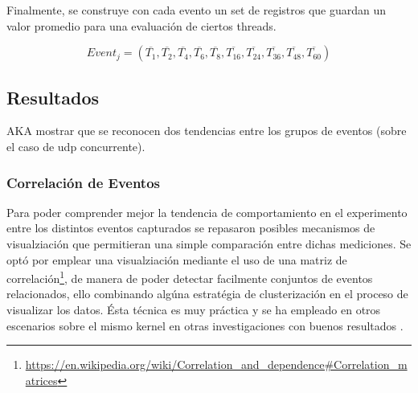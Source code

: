Finalmente, se construye con cada evento un set de registros que guardan un valor promedio para una evaluación de ciertos threads.

\begin{equation}
Event_j = \left(\overline{T_{1}}, \overline{T_{2}}, \overline{T_{4}}, \overline{T_{6}}, \overline{T_{8}}, \overline{T_{16}}, \overline{T_{24}}, \overline{T_{36}}, \overline{T_{48}}, \overline{T_{60}}\right)
\end{equation}

\subsection{Resultados}
AKA mostrar que se reconocen dos tendencias entre los grupos de eventos (sobre el caso de udp concurrente).


\subsubsection{Correlación de Eventos}
Para poder comprender mejor la tendencia de comportamiento en el experimento entre los distintos eventos capturados se repasaron posibles mecanismos de visualziación que permitieran una simple comparación entre dichas mediciones. Se optó por emplear una visualziación mediante el uso de una matriz de correlación\footnote{\url{https://en.wikipedia.org/wiki/Correlation_and_dependence#Correlation_matrices}}, de manera de poder detectar facilmente conjuntos de eventos relacionados, ello combinando algúna estratégia de clusterización en el proceso de visualizar los datos. Ésta técnica es muy práctica y se ha empleado en otros escenarios sobre el mismo kernel en otras investigaciones con buenos resultados \cite{paper:clusteringKernel}.

